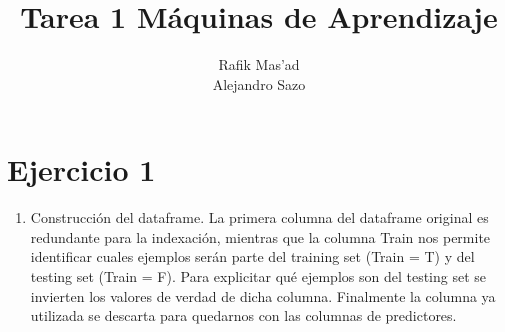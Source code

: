 \documentclass[11pt]{article}
\title{Tarea 1 Máquinas de Aprendizaje}
\author{Rafik Mas'ad\\Alejandro Sazo}
\begin{document}
    
    
    \maketitle
    
    

    

    \section{Ejercicio 1}\label{ejercicio-1}

    \begin{enumerate}
\def\labelenumi{(\alph{enumi})}
\itemsep1pt\parskip0pt
\item
  Construcción del dataframe. La primera columna del dataframe original
  es redundante para la indexación, mientras que la columna Train nos
  permite identificar cuales ejemplos serán parte del training set
  (Train = T) y del testing set (Train = F). Para explicitar qué
  ejemplos son del testing set se invierten los valores de verdad de
  dicha columna. Finalmente la columna ya utilizada se descarta para
  quedarnos con las columnas de predictores.
\end{enumerate}
\end{document}

